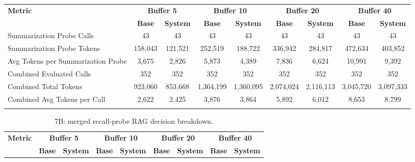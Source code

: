 \begin{landscape}
\begin{longtable}{@{}p{3.8cm}cccccccc@{}}
\toprule
\textbf{Metric} & \multicolumn{2}{c}{\textbf{Buffer 5}} & \multicolumn{2}{c}{\textbf{Buffer 10}} & \multicolumn{2}{c}{\textbf{Buffer 20}} & \multicolumn{2}{c}{\textbf{Buffer 40}} \\
\cmidrule(lr){2-3}\cmidrule(lr){4-5}\cmidrule(lr){6-7}\cmidrule(lr){8-9}
 & \textbf{Base} & \textbf{System} & \textbf{Base} & \textbf{System} & \textbf{Base} & \textbf{System} & \textbf{Base} & \textbf{System} \\
\midrule
\endhead
Summarization Probe Calls & 43 & 43 & 43 & 43 & 43 & 43 & 43 & 43 \\
Summarization Probe Tokens & 158,043 & 121,521 & 252,519 & 188,722 & 336,942 & 284,817 & 472,634 & 403,852 \\
Avg Tokens per Summarization Probe & 3,675 & 2,826 & 5,873 & 4,389 & 7,836 & 6,624 & 10,991 & 9,392 \\
Combined Evaluated Calls & 352 & 352 & 352 & 352 & 352 & 352 & 352 & 352 \\
Combined Total Tokens & 923,060 & 853,668 & 1,364,199 & 1,360,095 & 2,074,024 & 2,116,113 & 3,045,720 & 3,097,333 \\
Combined Avg Tokens per Call & 2,622 & 2,425 & 3,876 & 3,864 & 5,892 & 6,012 & 8,653 & 8,799 \\
\botrule
\end{longtable}
\begin{longtable}{@{}p{3.8cm}cccccccc@{}}
\caption{7B: merged recall-probe RAG decision breakdown.}\label{tab:app_7b_rag_probe}\\

\toprule
\textbf{Metric} & \multicolumn{2}{c}{\textbf{Buffer 5}} & \multicolumn{2}{c}{\textbf{Buffer 10}} & \multicolumn{2}{c}{\textbf{Buffer 20}} & \multicolumn{2}{c}{\textbf{Buffer 40}} \\
\cmidrule(lr){2-3}\cmidrule(lr){4-5}\cmidrule(lr){6-7}\cmidrule(lr){8-9}
 & \textbf{Base} & \textbf{System} & \textbf{Base} & \textbf{System} & \textbf{Base} & \textbf{System} & \textbf{Base} & \textbf{System} \\
\midrule
\endfirsthead


\end{longtable}
\end{landscape}
